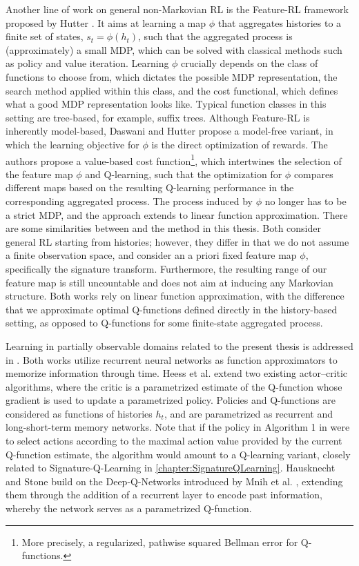 \documentclass[
    a4paper,
    11pt,
    bibliography=totoc,
    listof=totoc,      
    headinclude=true,
    cleardoublepage=empty,
]{scrbook}
\theoremstyle{plain}
\theoremstyle{definition}
\theoremstyle{remark}
\begin{document}
Another line of work on general non-Markovian RL is the Feature-RL framework proposed by Hutter \cite{hutter2009_frlpum,hutter2009_frlpsm,hutter2016_esabmdp}. 
It aims at learning a map $\phi$ that aggregates histories to a finite set of 
states, $s_t = \phi(h_t)$, such that the aggregated process is (approximately) 
a small MDP, which can be solved with classical methods such as policy and 
value iteration. Learning $\phi$ crucially depends on the class of functions 
to choose from, which dictates the possible MDP representation, the search 
method applied within this class, and the cost functional, which defines what 
a good MDP representation looks like. Typical function classes in this setting 
are tree-based, for example, suffix trees. Although Feature-RL is inherently 
model-based, Daswani and Hutter \cite{daswani2013_qhrl} propose a model-free 
variant, in which the learning objective for $\phi$ is the direct optimization 
of rewards. The authors propose a value-based cost function\footnote{
    More precisely, a regularized, pathwise squared Bellman error for 
    Q-functions.
}, which intertwines the selection of the feature map $\phi$ and Q-learning, 
such that the optimization for $\phi$ compares different maps based on 
the resulting Q-learning performance in the corresponding aggregated process. 
The process induced by $\phi$ no longer has to be a strict MDP, and the 
approach extends to linear function approximation. There are some 
similarities between \cite{daswani2013_qhrl} and the method in this thesis. 
Both consider general RL starting from histories; however, they differ in that 
we do not assume a finite observation space, and consider an a priori fixed 
feature map $\phi$, specifically the signature transform. Furthermore, the resulting 
range of our feature map is still uncountable and does not aim at inducing any 
Markovian structure. Both works rely on linear function approximation, with 
the difference that we approximate optimal Q-functions defined directly in the 
history-based setting, as opposed to Q-functions for some finite-state 
aggregated process.

Learning in partially observable domains related to the present thesis is 
addressed in \cite{hausknecht2015_drqpom,heess2015_mcwrnn}. Both works utilize 
recurrent neural networks as function approximators to memorize information 
through time. Heess et al. \cite{heess2015_mcwrnn} extend two existing 
actor–critic algorithms, where the critic is a parametrized estimate of the 
Q-function whose gradient is used to update a parametrized policy. Policies and 
Q-functions are considered as functions of histories $h_t$, and are 
parametrized as recurrent and long-short-term memory networks. Note that if the 
policy in Algorithm 1 in \cite{heess2015_mcwrnn} were to select actions according 
to the maximal action value provided by the current Q-function estimate, the 
algorithm would amount to a Q-learning variant, closely related to 
Signature-Q-Learning in \cref{chapter:SignatureQLearning}. Hausknecht and Stone 
\cite{hausknecht2015_drqpom} build on the Deep-Q-Networks introduced by Mnih 
et al. \cite{mnih2015_hctdrl}, extending them through the addition of a recurrent 
layer to encode past information, whereby the network serves as a parametrized 
Q-function.
\end{document}
